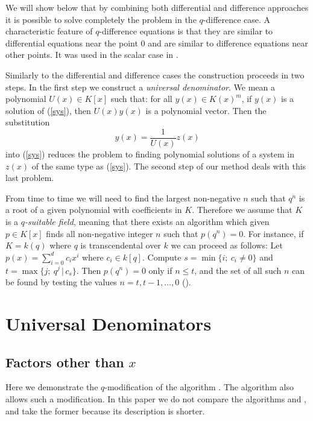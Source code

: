 We will show below that by combining
both
differential and difference approaches
it is possible
to solve completely the problem in
the $q$-difference case.
A characteristic feature of
$q$-difference equations is that they are similar to differential
equations near the point 0 and are similar to difference equations
near other points. It was used in the scalar case in \cite{Aprog}.

Similarly to the differential and difference cases the construction
proceeds in two steps. In the first step we construct a
{\em universal denominator}. We mean a polynomial $U(x) \in K[x]$
such that: for all $y(x) \in K(x)^m$, if $y(x)$ is a solution of
(\ref{sys}), then $U(x)y(x)$ is a polynomial vector. Then the
substitution
\begin{equation}
\label{subs}
y(x)=\frac 1 {U(x)}z(x)
\end{equation}
into (\ref{sys}) reduces
the problem to finding polynomial solutions of a system in $z(x)$ of
the same type as (\ref{sys}).  The second step of our method deals
with this last problem.

{}From time to time we will need to find the largest
non-negative $n$
such that $q^n$ is a root of a given polynomial with
coefficients in $K$.  Therefore we assume that $K$ is a {\em
$q$-suitable field}, meaning that there exists an algorithm which
given $p\in K[x]$ finds all
non-negative integer $n$ such that $p(q^n)=0$.  For
instance, if $K=k(q)$ where $q$ is transcendental over $k$ we can
proceed as follows: Let $p(x)=\sum_{i=0}^d c_i x^i$ where $c_i\in
k[q]$. Compute $s = \min\{i;\ c_i\ne 0\}$ and $t = \max\{j;\ q^j
\,|\, c_s\}$. Then $p(q^n)=0$ only if $n\le t$, and the set of all
such $n$ can be found by testing the values $n=t,t-1,\ldots,0$
(\cite{fpsac}).

\section{Universal Denominators}
\label{unden}


\subsection{Factors other than $x$}
\label{othx}
Here we demonstrate
the $q$-modification of the algorithm \cite{AB98}.
The algorithm \cite{vh98} also allows such a modification.
In this paper we do not compare  the algorithms \cite{AB98} and
\cite{vh98}, and take the former because its description
is shorter.

